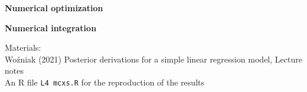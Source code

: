 \documentclass[notes,blackandwhite,mathsans]{beamer}
\begin{document}
{
\begin{frame}

\vspace{1cm} \textbf{\color{mcxs1}Numerical optimization}

\bigskip\textbf{\color{mcxs2}Numerical integration}

%

\bigskip\normalsize Materials:\\ \footnotesize
{\color{mcxs2}Wo\'zniak (2021) Posterior derivations for a simple linear regression model, Lecture notes}\\
{\color{mcxs2}An R file} \texttt{L4 mcxs.R} {\color{mcxs2}for the reproduction of the results}

\end{frame}
}





%
%
%
\end{document}
